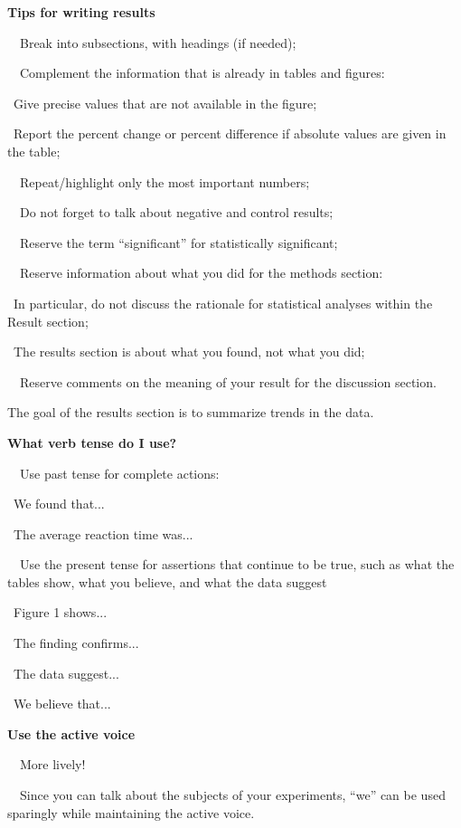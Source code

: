 \documentclass[a4paper, 12pt]{article}
\begin{document}
\textbf{Tips for writing results}
\par\ \textbullet\ Break into subsections, with headings (if needed);
\par\ \textbullet\ Complement the information that is already in tables and figures:
\par\quad\textopenbullet\ Give precise values that are not available in the figure;
\par\quad\textopenbullet\ Report the percent change or percent difference if absolute values are given in the table;
\par\ \textbullet\ Repeat/highlight only the most important numbers;
\par\ \textbullet\ Do not forget to talk about negative and control results;
\par\ \textbullet\ Reserve the term ``significant'' for statistically significant;
\par\ \textbullet\ Reserve information about what you did for the methods section:
\par\quad\textopenbullet\ In particular, do not discuss the rationale for statistical analyses within the Result section;
\par\quad\textopenbullet\ The results section is about what you found, not what you did;
\par\ \textbullet\ Reserve comments on the meaning of your result for the discussion section.

The goal of the results section is to summarize trends in the data.

\textbf{What verb tense do I use?}
\par\ \textbullet\ Use past tense for complete actions:
\par\quad\textopenbullet\ We found that...
\par\quad\textopenbullet\ The average reaction time was...
\par\ \textbullet\ Use the present tense for assertions that continue to be true, such as what the tables show, what you believe, and what the data suggest
\par\quad\textopenbullet\ Figure 1 shows...
\par\quad\textopenbullet\ The finding confirms...
\par\quad\textopenbullet\ The data suggest...
\par\quad\textopenbullet\ We believe that...

\textbf{Use the active voice}
\par\ \textbullet\ More lively!
\par\ \textbullet\ Since you can talk about the subjects of your experiments, ``we'' can be used sparingly while maintaining the active voice.
\end{document}

